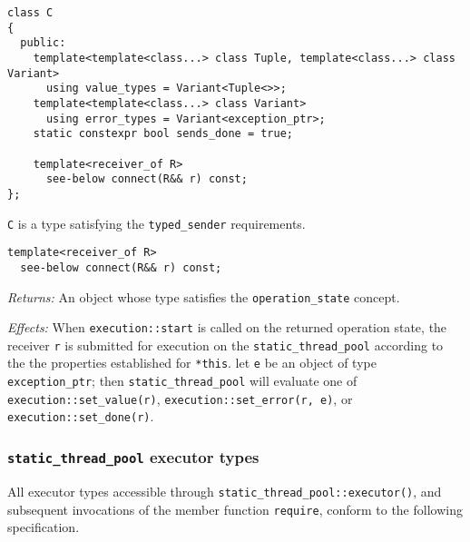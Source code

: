 \documentclass[a4paper,12pt,notitlepage,twoside,openright]{article}
\begin{document}
\begin{verbatim}
class C
{
  public:
    template<template<class...> class Tuple, template<class...> class Variant>
      using value_types = Variant<Tuple<>>;
    template<template<class...> class Variant>
      using error_types = Variant<exception_ptr>;
    static constexpr bool sends_done = true;

    template<receiver_of R>
      see-below connect(R&& r) const;
};
\end{verbatim}

\texttt{C} is a type satisfying the
\texttt{typed_sender} requirements.

\begin{verbatim}
template<receiver_of R>
  see-below connect(R&& r) const;
\end{verbatim}

\emph{Returns:} An object whose type satisfies the
\texttt{operation_state} concept.

\emph{Effects:} When \texttt{execution::start} is called on
the returned operation state, the receiver \texttt{r} is
submitted for execution on the \texttt{static_thread_pool}
according to the the properties established for
\texttt{*this}. let \texttt{e} be an object of
type \texttt{exception_ptr}; then
\texttt{static_thread_pool} will evaluate one of
\texttt{execution::set_value(r)},
\texttt{execution::set_error(r, e)}, or
\texttt{execution::set_done(r)}.

\hypertarget{static_thread_pool-executor-types}{%
\subsubsection{\texorpdfstring{\texttt{static_thread_pool}
executor
types}{ executor types}}\label{static_thread_pool-executor-types}}

All executor types accessible through
\texttt{static_thread_pool::executor()}, and subsequent
invocations of the member function \texttt{require}, conform
to the following specification.
\end{document}
